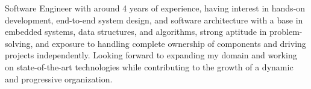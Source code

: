 
\begin{cvparagraph}
Software Engineer with around 4 years of experience, having interest in hands-on development, end-to-end system design, and software architecture with a base in embedded systems, data structures, and algorithms, strong aptitude in problem-solving, and exposure to handling complete ownership of components and driving projects independently. Looking forward to expanding my domain and working on state-of-the-art technologies while contributing to the growth of a dynamic and progressive organization.
\end{cvparagraph}
